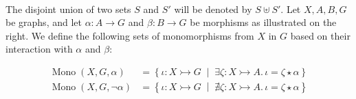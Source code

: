 \begin{notation}
    \label{subgraph_counting:notation:mono_sets}
\ \newline
\noindent
\begin{minipage}{0.69\textwidth}
\vspace{2mm}
\noindent  The disjoint union of two sets \( S \) and \( S' \) will be denoted by \( S \uplus S' \). Let \( X, A, B, G \) be graphs, and let \( \alpha \colon A \to G \) and \( \beta \colon B \to G \) be morphisms as illustrated on the right. We define the following sets of monomorphisms from $X$ in $G$ based on their interaction with $\alpha$ and $\beta$:    
\end{minipage}%
\begin{minipage}{0.30\textwidth}
    \hfill
\end{minipage} 
    \begin{align*}
        \operatorname{Mono}(X,G,\alpha) &= \left\{ \iota \colon X \rightarrowtail G \;\middle|\; \exists \zeta \colon X \rightarrowtail A.\, \iota = \zeta \star \alpha \right\}
        \\
        \operatorname{Mono}(X,G,\lnot \alpha) &= \left\{ \iota \colon X \rightarrowtail G \;\middle|\; \nexists \zeta \colon X \rightarrowtail A.\, \iota = \zeta \star \alpha \right\}

\end{align*}
\end{notation}
